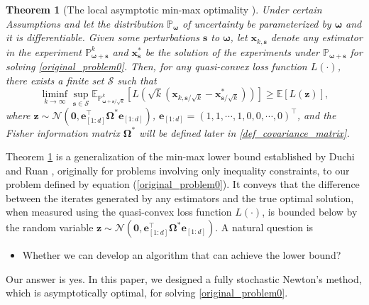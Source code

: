 \documentclass[aos]{imsart}
\numberwithin{equation}{section}
\theoremstyle{plain}
\newtheorem{theorem}{Theorem}
\begin{document}
\begin{theorem}
[The local asymptotic min-max optimality \cite{duchi2021asymptotic}]
\label{theorem_minimax_optimality}
    Under certain Assumptions and let the distribution $\mathbb{P}_{\bm{\omega}}$ of uncertainty be parameterized by $\bm{\omega}$ and it is differentiable. Given some perturbations  $\bm{s}$ to $\bm{\omega}$, let $\bm{x}_{k, \bm{s}}$ denote any estimator in the experiment $\mathbb{P}_{\bm{\omega} + \bm{s}}^{k}$ and $\bm{x}_{\bm{s}}^{*}$ be the solution of the experiments under $\mathbb{P}_{\bm{\omega} + \bm{s}}$ for solving \eqref{original_problem0}. Then, for any quasi-convex loss function $L(\cdot)$, there exists a finite set $\mathcal{S}$ such that
    \begin{equation*}
        \mathop{\lim \inf}_{k \to \infty} \sup_{\bm{s} \in \mathcal{S}} \mathbb{E}_{\mathbb{P}_{\bm{\omega} + \bm{s} / \sqrt{k}}^{k}} \left[L\left( \sqrt{k} \left(\bm{x}_{k, \bm{s}/\sqrt{k}} - \bm{x}^{*}_{\bm{s}/\sqrt{k}} \right)\right) \right] \geq \mathbb{E}\left[ L\left(\bm{z} \right)\right],
    \end{equation*}
    where $\bm{z} \sim \mathcal{N}\left(\bm{0}, \bm{e}^{\top}_{[1:d]}\bm{\Omega}^{*}\bm{e}_{[1:d]} \right)$, $\bm{e}_{[1:d]} = \left( 1, 1, \cdots, 1, 0,0, \cdots, 0\right)^{\top}$, and the Fisher information matrix $\bm{\Omega}^{*}$ will be defined later in \eqref{def_covariance_matrix}.
\end{theorem}

Theorem \ref{theorem_minimax_optimality} is a generalization of the min-max lower bound established by Duchi and Ruan \cite[Theorem~1]{duchi2021asymptotic}, originally for problems involving only inequality constraints, to our problem defined by equation (\ref{original_problem0}).
It conveys that the difference between the iterates generated by any estimators and the true optimal solution, when measured using the quasi-convex loss function $L(\cdot)$, is bounded below by the random variable $\bm{z} \sim \mathcal{N}\left(\bm{0}, \bm{e}^{\top}_{[1:d]}\bm{\Omega}^{*}\bm{e}_{[1:d]} \right)$. A natural question is 

\begin{itemize}
\item Whether we can develop an algorithm that can achieve the lower bound?

\end{itemize}
Our answer is yes. In this paper, we designed a fully stochastic Newton's method, which is asymptotically optimal, for solving \eqref{original_problem0}.
\end{document}
